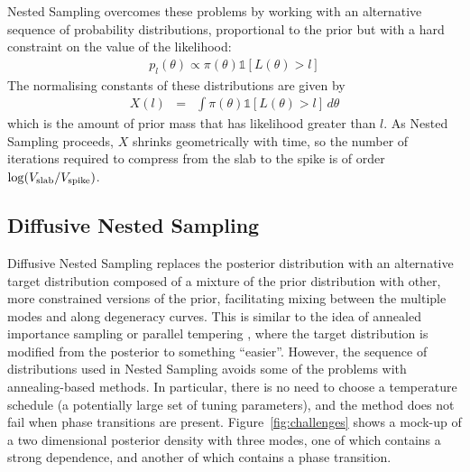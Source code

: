 \documentclass[letterpaper, 11pt]{article}
\begin{document}
Nested Sampling \citep{skilling} overcomes these problems by working with an
alternative sequence of probability distributions, proportional to the prior
but with a hard constraint on the value of the likelihood:
\begin{eqnarray}
p_{l}(\theta) \propto \pi(\theta)\mathds{1}\left[L(\theta) > l\right]
\end{eqnarray}
The normalising constants of these distributions are given by
\begin{eqnarray}
X(l) &=& \int \pi(\theta)\mathds{1}\left[L(\theta) > l\right] \, d\theta
\end{eqnarray}
which is the amount of prior mass that has likelihood greater than
$l$. As Nested Sampling proceeds, $X$ shrinks geometrically with time, so
the number of iterations required to compress from the slab to the spike is
of order $\log(V_{\rm slab}/V_{\rm spike})$.

\subsection{Diffusive Nested Sampling}
Diffusive Nested Sampling
\citep[DNS][]{dnest} replaces the posterior distribution with an alternative target
distribution composed of a mixture of the prior distribution with other, more
constrained versions of the prior, facilitating mixing between the multiple modes
and along degeneracy curves.
This is similar to the idea of annealed importance sampling
\citep{neal} or parallel tempering \citep{pt},
where the target distribution is modified from the posterior to something
``easier''. However,
the sequence of distributions used in Nested Sampling avoids some of the
problems with annealing-based methods. In particular, there is no need to choose
a temperature schedule (a potentially large set of tuning parameters),
and the method does not fail when phase transitions
are present.
Figure~\ref{fig:challenges} shows a mock-up of a two dimensional posterior
density with three modes, one of which contains a strong dependence, and
another of which contains a phase transition.
\end{document}
